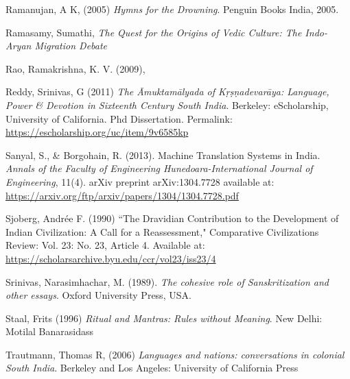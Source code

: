 \begin{thebibliography}{99}
  Ramanujan, A K, (2005) \textit{Hymns for the Drowning}. Penguin Books India, 2005.

  Ramasamy, Sumathi, \textit{The Quest for the Origins of Vedic Culture: The Indo-Aryan Migration Debate}

  Rao, Ramakrishna, K. V. (2009), 

  Reddy, Srinivas, G (2011) \textit{The Āmuktamālyada of Kṛṣṇadevarāya: Language, Power \& Devotion in Sixteenth Century South India}. Berkeley: eScholarship, University of California. Phd Dissertation. Permalink: \url{https://escholarship.org/uc/item/9v6585kp}

  Sanyal, S., \& Borgohain, R. (2013). Machine Translation Systems in India. \textit{Annals of the Faculty of Engineering Hunedoara-International Journal of Engineering}, 11(4). arXiv preprint arXiv:1304.7728 available at: \url{https://arxiv.org/ftp/arxiv/papers/1304/1304.7728.pdf}

  Sjoberg, Andrée F. (1990) “The Dravidian Contribution to the Development of Indian Civilization: A Call for a Reassessment," Comparative Civilizations Review: Vol. 23: No. 23, Article 4. Available at: \url{https://scholarsarchive.byu.edu/ccr/vol23/iss23/4}

  Srinivas, Narasimhachar, M. (1989). \textit{The cohesive role of Sanskritization and other essays}. Oxford University Press, USA.

  Staal, Frits (1996) \textit{Ritual and Mantras: Rules without Meaning}. New Delhi: Motilal Banarasidass

  Trautmann, Thomas R, (2006) \textit{Languages and nations: conversations in colonial South India}. Berkeley and Los Angeles: University of California Press

 \end{thebibliography}

\theendnotes

